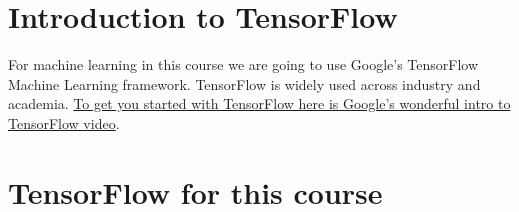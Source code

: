 

\section{Introduction to TensorFlow}

For machine learning in this course we are going to use Google’s TensorFlow Machine Learning framework. TensorFlow is widely used across industry and academia. \href{https://www.youtube.com/watch?v=yjprpOoH5c8}{To get you started with TensorFlow here is Google’s wonderful intro to TensorFlow video}.

\section{TensorFlow for this course}

